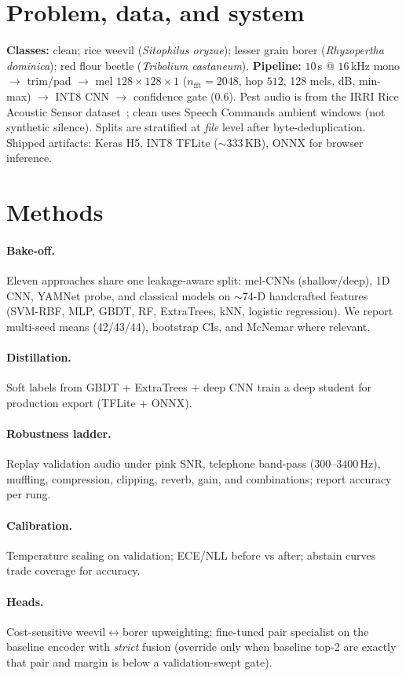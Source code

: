 \documentclass{article}
\begin{document}
\section{Problem, data, and system}
\textbf{Classes:} clean; rice weevil (\emph{Sitophilus oryzae}); lesser grain borer (\emph{Rhyzopertha dominica}); red flour beetle (\emph{Tribolium castaneum}).
\textbf{Pipeline:} $10$\,s @ $16$\,kHz mono $\rightarrow$ trim/pad $\rightarrow$ mel $128\times128\times1$ ($n_{\mathrm{fft}}{=}2048$, hop $512$, 128 mels, dB, min-max) $\rightarrow$ INT8 CNN $\rightarrow$ confidence gate ($0.6$).
Pest audio is from the IRRI Rice Acoustic Sensor dataset~\cite{balingbing2024}; clean uses Speech Commands ambient windows (not synthetic silence).
Splits are stratified at \emph{file} level after byte-deduplication.
Shipped artifacts: Keras H5, INT8 TFLite ($\sim$333\,KB), ONNX for browser inference.

\section{Methods}
\paragraph{Bake-off.}
Eleven approaches share one leakage-aware split: mel-CNNs (shallow/deep), 1D CNN, YAMNet probe, and classical models on $\sim$74-D handcrafted features (SVM-RBF, MLP, GBDT, RF, ExtraTrees, kNN, logistic regression).
We report multi-seed means (42/43/44), bootstrap CIs, and McNemar where relevant.
\paragraph{Distillation.}
Soft labels from GBDT + ExtraTrees + deep CNN train a deep student for production export (TFLite + ONNX).
\paragraph{Robustness ladder.}
Replay validation audio under pink SNR, telephone band-pass ($300$--$3400$\,Hz), muffling, compression, clipping, reverb, gain, and combinations; report accuracy per rung.
\paragraph{Calibration.}
Temperature scaling on validation; ECE/NLL before vs after; abstain curves trade coverage for accuracy.
\paragraph{Heads.}
Cost-sensitive weevil$\leftrightarrow$borer upweighting; fine-tuned pair specialist on the baseline encoder with \emph{strict} fusion (override only when baseline top-2 are exactly that pair and margin is below a validation-swept gate).
\end{document}
